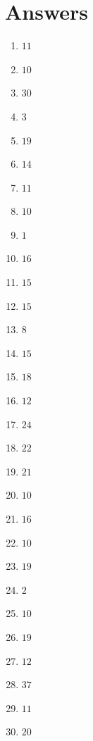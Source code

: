 \documentclass[12pt]{article}
\begin{document}
\newpage
\section*{Answers}
\begin{multicols}{2}
\begin{enumerate}
    \item $11$
    \item $10$
    \item $30$
    \item $3$
    \item $19$
    \item $14$
    \item $11$
    \item $10$
    \item $1$
    \item $16$
    \item $15$
    \item $15$
    \item $8$
    \item $15$
    \item $18$
    \item $12$
    \item $24$
    \item $22$
    \item $21$
    \item $10$
    \item $16$
    \item $10$
    \item $19$
    \item $2$
    \item $10$
    \item $19$
    \item $12$
    \item $37$
    \item $11$
    \item $20$
\end{enumerate}
\end{multicols}
\end{document}
